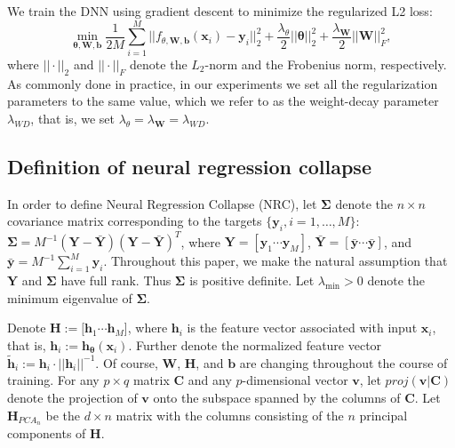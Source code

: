 \documentclass{article}
\theoremstyle{plain}
\theoremstyle{definition}
\theoremstyle{remark}
\newcommand{\bW}{{\mathbf W}}
\newcommand{\bY}{{\mathbf Y}}
\newcommand{\bH}{{\mathbf H}}
\newcommand{\bC}{{\mathbf C}}
\newcommand{\bh}{{\mathbf h}}
\newcommand{\bhi}{{\mathbf h}_i}
\newcommand{\by}{{\mathbf y}}
\newcommand{\byb}{{\bar{\mathbf y}}}
\newcommand{\bYb}{{\bar{\mathbf Y}}}
\newcommand{\bx}{{\mathbf x}}
\newcommand{\bb}{{\mathbf b}}
\newcommand{\bv}{{\mathbf v}}
\newcommand{\bSigma}{{\mathbf \Sigma}}
\newcommand{\byi}{{\mathbf y}_i}
\newcommand{\bxi}{{\mathbf x}_i}
\newcommand{\lmin}{\lambda_{\text{min}}}
\begin{document}
We train the DNN using gradient descent to minimize the regularized L2 loss: 
\[
\min_{\mathbf{\theta}, \bW, \bb} \frac{1}{2M} \sum_{i=1}^{M} ||f_{\theta,\bW,\bb}(\bxi) - \byi||_2^2 + \frac{\lambda_{\theta}}{2} ||\mathbf{\theta}||_2^2 +  \frac{\lambda_{\bW}}{2}||\bW||_F^2,
\]
where $||\cdot||_2$ and $||\cdot||_F$ denote the $L_2$-norm and the Frobenius norm, respectively.
As commonly done in practice,  in our experiments we set all the regularization parameters to the same value, which we refer to as the weight-decay parameter $\lambda_{WD}$, that is, we set $\lambda_{\theta} = \lambda_{\bW} =\lambda_{WD}$. 

\subsection{Definition of neural regression collapse}

In order to define Neural Regression Collapse (NRC), let  $\bSigma$ denote the $n \times n$ covariance matrix corresponding to the targets $\{\byi, i=1,\ldots,M \}$: $\bSigma = M^{-1}(\bY - \bYb) (\bY - \bYb)^{T}$, where $\bY = [\by_1 \cdots \by_M]$, $\bYb = [\byb \cdots \byb]$, and $\byb = M^{-1} \sum_{i=1}^M \byi$.
Throughout this paper, we make the natural assumption that $\bY$ and $\bSigma$ have full rank. Thus $\bSigma$ is positive definite. 
Let $\lmin >0$ denote the minimum eigenvalue of $\bSigma$. 

Denote $\bH := [\bh_1 \cdots \bh_M$], where $\bhi$ is the feature vector associated with input $\bxi$, that is,  $\bhi := \bh_{\mathbf{\theta}}(\bx_i)$. Further denote the normalized feature vector $\widetilde{\bh}_i := \bhi\cdot||\bhi||^{-1}$. Of course, $\bW$, $\bH$, and $\bb$ are changing throughout the course of training. 
For any $p \times q$ matrix $\bC$ and any $p$-dimensional vector $\bv$, let $proj(\bv|\bC)$ denote the projection of $\bv$ onto the subspace spanned by the columns of $\bC$. 
Let $\bH_{PCA_n}$ be the $d \times n$ matrix with the columns consisting of the $n$
principal components of $\bH$.  
\end{document}

